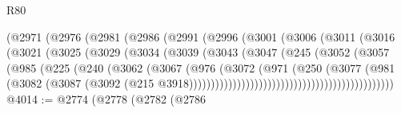 \begin{lexlean}{R80}
\begin{coremodule}
                            (@2971
                              (@2976
                                (@2981
                                  (@2986
                                    (@2991
                                      (@2996
                                        (@3001
                                          (@3006
                                            (@3011
                                              (@3016
                                                (@3021
                                                  (@3025
                                                    (@3029
                                                      (@3034
                                                        (@3039
                                                          (@3043
                                                            (@3047
                                                              (@245
                                                                (@3052
                                                                  (@3057
                                                                    (@985
                                                                      (@225
                                                                        (@240
                                                                          (@3062
                                                                            (@3067
                                                                              (@976
                                                                                (@3072
                                                                                  (@971
                                                                                    (@250
                                                                                      (@3077
                                                                                        (@981
                                                                                          (@3082
                                                                                            (@3087
                                                                                              (@3092
                                                                                                (@215
                                                                                                  @3918)))))))))))))))))))))))))))))))))))))))))))))))
@4014 := @2774
    (@2778
      (@2782
        (@2786

\end{coremodule}
\end{lexlean}

